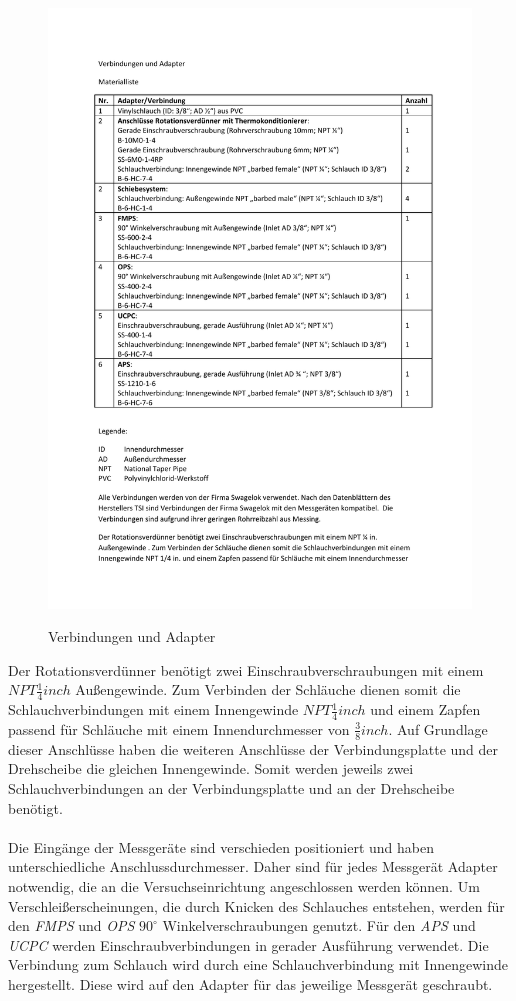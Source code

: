 \begin{figure}[H]
        \myfloatalign
        {\includegraphics[width=.9\linewidth]{gfx/construction/material.pdf}} \quad
        \caption[Verbindungen und Adapter]
        {Verbindungen und Adapter}
        \label{fig:material}
\end{figure}
Der Rotationsverd\"{u}nner ben\"{o}tigt zwei Einschraubverschraubungen mit einem \(\textit{NPT} \frac{1}{4} inch\) Au{\ss}engewinde. Zum Verbinden der Schl\"{a}uche dienen somit die Schlauchverbindungen mit einem Innengewinde \(\textit{NPT} \frac{1}{4} inch\) und einem Zapfen passend f\"{u}r Schl\"{a}uche mit einem Innendurchmesser von \(\frac{3}{8} inch\). Auf Grundlage dieser Anschl\"{u}sse haben die weiteren Anschl\"{u}sse der Verbindungsplatte und der Drehscheibe die gleichen Innengewinde. Somit werden jeweils zwei Schlauchverbindungen an der Verbindungsplatte und an der Drehscheibe ben\"{o}tigt.
\\\\
Die Eing\"{a}nge der Messger\"{a}te sind verschieden positioniert und haben unterschiedliche Anschlussdurchmesser. Daher sind f\"{u}r jedes Messger\"{a}t Adapter notwendig, die an die Versuchseinrichtung angeschlossen werden k\"{o}nnen. Um Verschlei{\ss}erscheinungen, die durch Knicken des Schlauches entstehen, werden f\"{u}r den \textit{FMPS} und \textit{OPS} \(90^\circ\) Winkelverschraubungen genutzt. F\"{u}r den \textit{APS} und \textit{UCPC} werden Einschraubverbindungen in gerader Ausf\"{u}hrung verwendet. Die Verbindung zum Schlauch wird durch eine Schlauchverbindung mit Innengewinde hergestellt. Diese wird auf den Adapter f\"{u}r das jeweilige Messger\"{a}t geschraubt.
